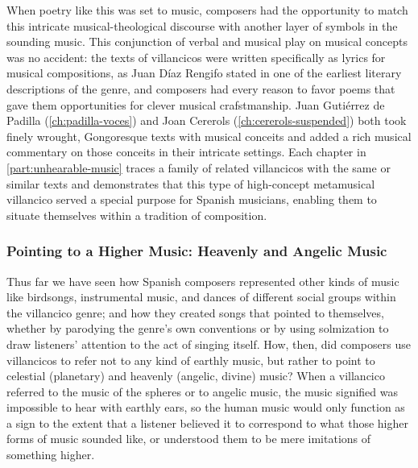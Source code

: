 When poetry like this was set to music, composers had the opportunity to match
this intricate musical-theological discourse with another layer of symbols in
the sounding music.
This conjunction of verbal and musical play on musical concepts was no
accident: the texts of villancicos were written specifically as lyrics for
musical compositions, as Juan Díaz Rengifo stated in one of the earliest
literary descriptions of the genre, and composers had every reason to favor
poems that gave them opportunities for clever musical crafstmanship.%
    \Autocite{Rengifo:ArteMetrica}
Juan Gutiérrez de Padilla (\cref{ch:padilla-voces}) and Joan Cererols
(\cref{ch:cererols-suspended}) both took finely wrought, Gongoresque texts with
musical conceits and added a rich musical commentary on those conceits in their
intricate settings.
Each chapter in \cref{part:unhearable-music} traces a family of related
villancicos with the same or similar texts and demonstrates that this type of
high-concept metamusical villancico served a special purpose for Spanish
musicians, enabling them to situate themselves within a tradition of
composition.

\subsubsection{Pointing to a Higher Music: Heavenly and Angelic Music}

Thus far we have seen how Spanish composers represented other kinds of music
like birdsongs, instrumental music, and dances of different social groups
within the villancico genre; and how they created songs that pointed to
themselves, whether by parodying the genre's own conventions or by using
solmization to draw listeners' attention to the act of singing itself.
How, then, did composers use villancicos to refer not to any kind of earthly
music, but rather to point to celestial (planetary) and heavenly (angelic,
divine) music?
When a villancico referred to the music of the spheres or to angelic music, the
music signified was impossible to hear with earthly ears, so the human music
would only function as a sign to the extent that a listener believed it to
correspond to what those higher forms of music sounded like, or understood them
to be mere imitations of something higher.

